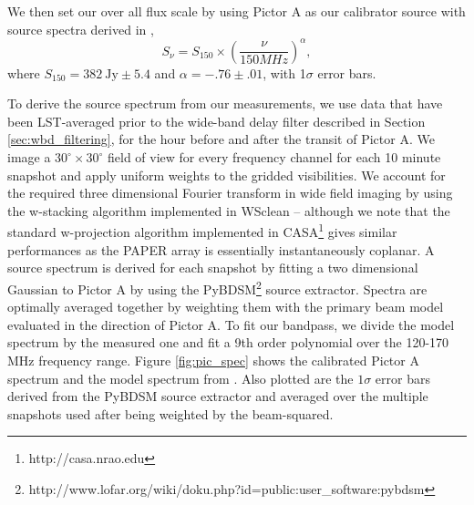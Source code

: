 \documentclass[twocolumn,numberedappendix]{emulateapj} \shorttitle{New Limits on the 21 cm Power Spectrum at $z=8.4$}
\begin{document}
We then set our over all flux scale by using Pictor A as our calibrator source
with source spectra derived in \citet{jacobs_et_al2013}, 
\begin{equation}
    S_{\nu} = S_{150}\times\left(\frac{\nu}{150MHz}\right)^{\alpha},
\end{equation}
where $S_{150} = 382~\text{Jy} \pm 5.4$ and $\alpha = -.76 \pm .01$, with
1$\sigma$ error bars.



To derive the source spectrum from our measurements, we use data that have been
LST-averaged prior to the wide-band delay filter described in Section
\ref{sec:wbd_filtering}, for the hour before and after the transit of Pictor A.
We image a $30^\circ \times 30^\circ$ field of view for every frequency channel
for each 10 minute snapshot and apply uniform weights to the gridded
visibilities. We account for the required three dimensional Fourier transform in
wide field imaging by using the w-stacking algorithm implemented in WSclean
\citep{offringa_et_al2014} – although we note that the standard w-projection
algorithm implemented in CASA\footnote{http://casa.nrao.edu} gives similar
performances as the PAPER array is essentially instantaneously coplanar.  A
source spectrum is derived for each snapshot by fitting a two dimensional
Gaussian to Pictor A by using the
PyBDSM\footnote{http://www.lofar.org/wiki/doku.php?id=public:user\_software:pybdsm}
source extractor. Spectra are optimally averaged together by weighting them with
the primary beam model evaluated in the direction of Pictor A. To fit our
bandpass, we divide the model spectrum by the measured one and fit a 9th order
polynomial over the 120-170 MHz frequency range. Figure \ref{fig:pic_spec} shows
the calibrated Pictor A spectrum and the model spectrum from
\citet{jacobs_et_al2013}. Also plotted are the $1\sigma$ error bars derived from the PyBDSM source extractor and averaged over the multiple snapshots used after being weighted by the beam-squared.
\end{document}
